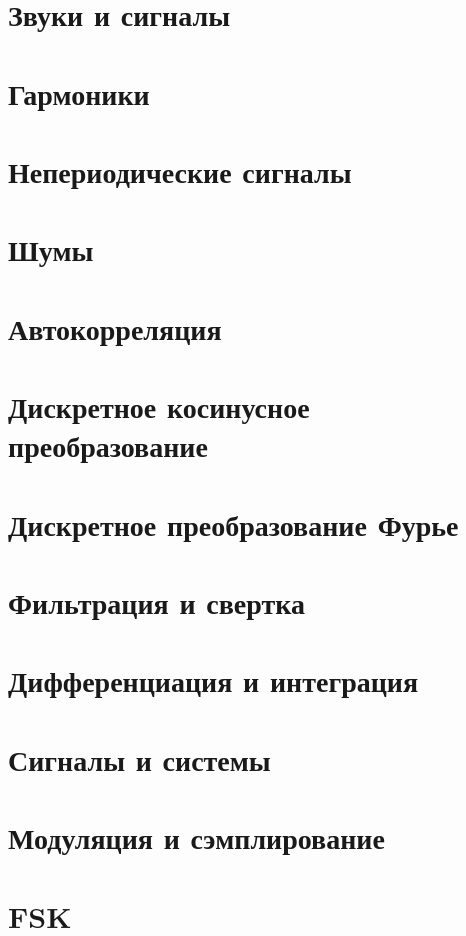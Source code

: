 \section{Звуки и сигналы}

\newpage

\section{Гармоники}

\newpage

\section{Непериодические сигналы}

\newpage

\section{Шумы}

\newpage

\section{Автокорреляция }

\newpage

\section{Дискретное косинусное преобразование }

\newpage

\section{Дискретное преобразование Фурье }

\newpage

\section{Фильтрация и свертка }

\newpage

\section{Дифференциация и интеграция }

\newpage

\section{Сигналы и системы }

\newpage

\section{Модуляция и сэмплирование }

\newpage

\section{FSK}

\newpage

